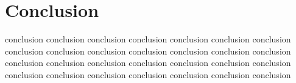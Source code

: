 \chapter*{Conclusion}


conclusion conclusion conclusion conclusion conclusion conclusion conclusion conclusion conclusion conclusion conclusion conclusion conclusion conclusion conclusion conclusion conclusion conclusion conclusion conclusion conclusion conclusion conclusion conclusion conclusion conclusion conclusion conclusion 